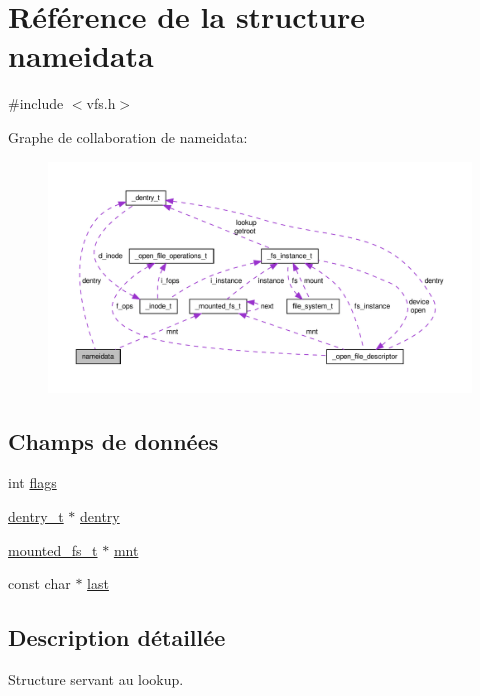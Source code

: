 \hypertarget{structnameidata}{\section{\-Référence de la structure nameidata}
\label{structnameidata}
}


{\ttfamily \#include $<$vfs.\-h$>$}



\-Graphe de collaboration de nameidata\-:\nopagebreak
\begin{figure}[H]
\begin{center}
\leavevmode
\includegraphics[width=350pt]{structnameidata__coll__graph}
\end{center}
\end{figure}
\subsection*{\-Champs de données}
\begin{DoxyCompactItemize}
\item 
int \hyperlink{structnameidata_a9064ec2b4dd712691e3c7442e48ce798}{flags}
\item 
\hyperlink{vfs_8h_ade5c998c6b3f09d2cf45d0e5ef8787da}{dentry\-\_\-t} $\ast$ \hyperlink{structnameidata_a19b1de01d7a6f689707fa7079cb54d7c}{dentry}
\item 
\hyperlink{vfs_8h_ab4e925860df7937f38b15433bb05225a}{mounted\-\_\-fs\-\_\-t} $\ast$ \hyperlink{structnameidata_a5488ed23ef4b37b431921f71b15e1f19}{mnt}
\item 
const char $\ast$ \hyperlink{structnameidata_a4a11e098a53839c36c2a0a4e732f8037}{last}
\end{DoxyCompactItemize}


\subsection{\-Description détaillée}
\-Structure servant au lookup. 

